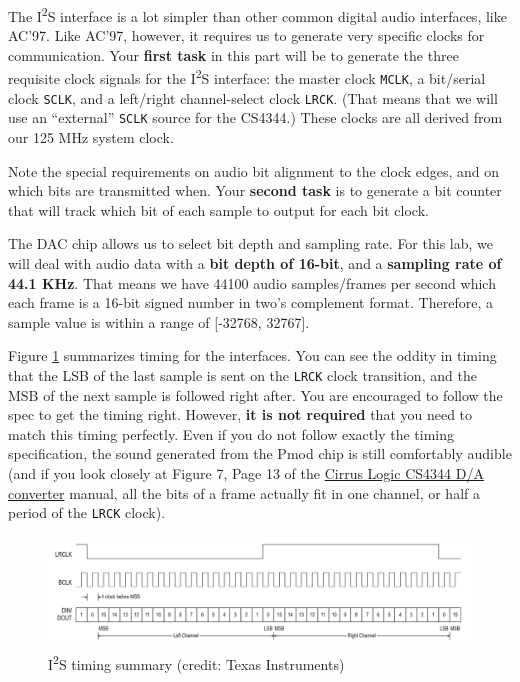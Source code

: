 \documentclass[11pt]{article}
\newcommand{\itwos}{I\textsuperscript{2}S}
\begin{document}
The \itwos{} interface is a lot simpler than other common digital audio interfaces, like AC'97. Like AC'97, however, it requires us to generate very specific clocks for communication. Your \textbf{first task} in this part will be to generate the three requisite clock signals for the \itwos{} interface: the master clock \verb|MCLK|, a bit/serial clock \verb|SCLK|, and a left/right channel-select clock \verb|LRCK|. (That means that we will use an ``external'' \verb|SCLK| source for the CS4344.) These clocks are all derived from our 125 MHz system clock.

Note the special requirements on audio bit alignment to the clock edges, and on which bits are transmitted when. Your \textbf{second task} is to generate a bit counter that will track which bit of each sample to output for each bit clock.

The DAC chip allows us to select bit depth and sampling rate. For this lab, we will deal with audio data with a \textbf{bit depth of 16-bit}, and a \textbf{sampling rate of 44.1 KHz}. That means we have 44100 audio samples/frames per second which each frame is a 16-bit signed number in two's complement format. Therefore, a sample value is within a range of [-32768, 32767].

Figure \ref{fig:timing} summarizes timing for the interfaces. You can see the oddity in timing that the LSB of the last sample is sent on the \verb|LRCK| clock transition, and the MSB of the next sample is followed right after. You are encouraged to follow the spec to get the timing right. However, \textbf{it is not required} that you need to match this timing perfectly. Even if you do not follow exactly the timing specification, the sound generated from the Pmod chip is still comfortably audible (and if you look closely at Figure 7, Page 13 of the \href{https://d3uzseaevmutz1.cloudfront.net/pubs/proDatasheet/CS4344-45-48_F2.pdf}{Cirrus Logic CS4344 D/A converter} manual, all the bits of a frame actually fit in one channel, or half a period of the \verb|LRCK| clock).

\begin{figure}[H]
  \begin{center}
    \includegraphics[width=6in]{figs/pmodi2s_timingdiagram.png}
    \caption{\itwos{} timing summary (credit: Texas Instruments)}
    \label{fig:timing}
  \end{center}
\end{figure}
\end{document}
